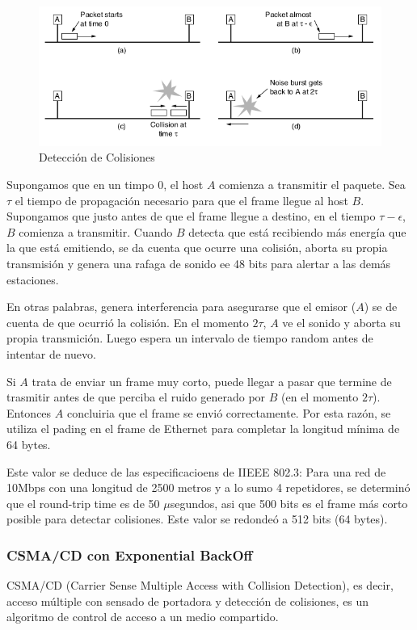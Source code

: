 \begin{figure}[H]
	\centering
	\includegraphics[width=\textwidth
]{images/deteccion-colisiones.png}
	\caption[Detección de Colisiones]{Detección de Colisiones}
	\label{fig:deteccion-colisiones}
\end{figure}

Supongamos que en un timpo 0, el host \(A\) comienza a transmitir el paquete. Sea   \(\tau\) el tiempo de propagación necesario para que el frame llegue al host \(B\). Supongamos que justo antes de que el frame llegue a destino, en el tiempo \(\tau-\epsilon\), \(B\) comienza a transmitir. Cuando \(B\) detecta que está recibiendo más energía que la que está emitiendo, se da cuenta que ocurre una colisión, aborta su propia transmisión y genera una rafaga de sonido ee 48 bits para alertar a las demás estaciones. 

En otras palabras, genera interferencia para asegurarse que el emisor (\(A\)) se de cuenta de que ocurrió la colisión. En el momento \(2\tau\), \(A\) ve el sonido y aborta su propia transmición. Luego espera un intervalo de tiempo random antes de intentar de nuevo.

Si \(A\) trata de enviar un frame muy corto, puede llegar a pasar que termine de trasmitir antes de que  perciba el ruido generado por \(B\) (en el momento \(2\tau\)). Entonces \(A\) concluiria que el frame se envió correctamente. Por esta razón, se utiliza el pading en el frame de Ethernet para completar la longitud mínima de 64 bytes.

Este valor se deduce de las especificacioens de IIEEE 802.3: Para una red de 10Mbps con una longitud de 2500 metros y a lo sumo 4 repetidores, se determinó que el round-trip time es de 50 \(\mu\)segundos, asi que 500 bits es el frame más corto posible para detectar colisiones. Este valor se redondeó a 512 bits (64 bytes).

\subsubsection{CSMA/CD con Exponential BackOff}
CSMA/CD (Carrier Sense Multiple Access with Collision Detection), es decir, acceso múltiple con sensado de portadora y detección de colisiones, es un algoritmo de control de acceso a un medio compartido.

